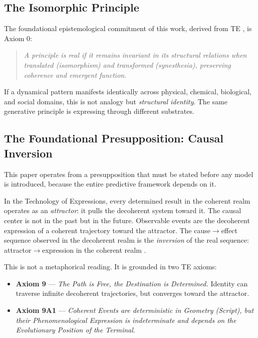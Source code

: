 \documentclass[12pt,a4paper]{article}
\begin{document}
\subsection{The Isomorphic Principle}

The foundational epistemological commitment of this work, derived from TE \cite{te_core}, is Axiom 0:

\begin{quote}
\emph{A principle is real if it remains invariant in its structural relations when translated (isomorphism) and transformed (synesthesia), preserving coherence and emergent function.}
\end{quote}

If a dynamical pattern manifests identically across physical, chemical, biological, and social domains, this is not analogy but \emph{structural identity}. The same generative principle is expressing through different substrates.

\subsection{The Foundational Presupposition: Causal Inversion}

This paper operates from a presupposition that must be stated before any model is introduced, because the entire predictive framework depends on it.

In the Technology of Expressions, every determined result in the coherent realm operates as an \emph{attractor}: it pulls the decoherent system toward it. The causal center is not in the past but in the future. Observable events are the decoherent expression of a coherent trajectory toward the attractor. The cause$\to$effect sequence observed in the decoherent realm is the \emph{inversion} of the real sequence: attractor$\to$expression in the coherent realm \cite{ost_teleodynamics}.

This is not a metaphorical reading. It is grounded in two TE axioms:

\begin{itemize}[leftmargin=2em]
    \item \textbf{Axiom 9} --- \emph{The Path is Free, the Destination is Determined.} Identity can traverse infinite decoherent trajectories, but converges toward the attractor.
    \item \textbf{Axiom 9A1} --- \emph{Coherent Events are deterministic in Geometry (Script), but their Phenomenological Expression is indeterminate and depends on the Evolutionary Position of the Terminal.}
\end{itemize}
\end{document}
